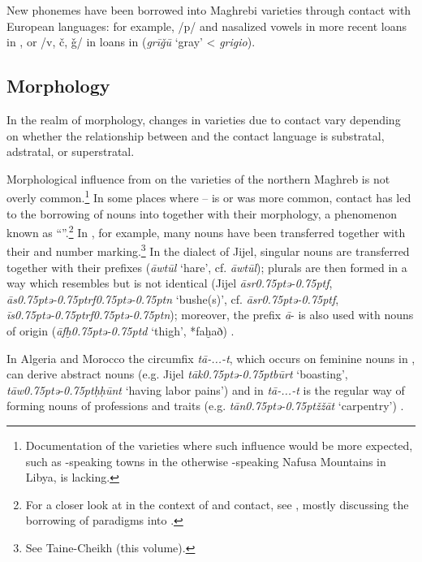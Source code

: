 \documentclass[output=paper]{langsci/langscibook}
\begin{document}
  New phonemes have been borrowed into Maghrebi varieties through contact with European languages: for example, /p/ and nasalized vowels in more recent  loans in  , or /v, č, ǧ/ in  loans in   (\textit{grīǧū} ‘gray’ < \textit{grigio}).

  \subsection{Morphology}\label{Morphology}

In the realm of morphology, changes in  varieties due to contact vary depending on whether the relationship between  and the contact language is substratal, adstratal, or superstratal.

  Morphological influence from  on the  varieties of the northern Maghreb is not overly common.\footnote{Documentation of the varieties where such influence would be more expected, such as -speaking towns in the otherwise -speaking Nafusa Mountains in Libya, is lacking.} In some places where --  is or was more common, contact has led to the borrowing of  nouns into  together with their morphology, a phenomenon known as “”.\footnote{For a closer look at  in the context of  and  contact, see \citet{Kossmann2010}, mostly discussing the borrowing of  paradigms into .} In , for example, many nouns have been transferred together with their  and number marking.\footnote{See Taine-Cheikh (this volume).} In the dialect of Jijel,  singular nouns are transferred together with their prefixes (\textit{āwtūl} ‘hare’, cf.  \textit{āwtūl}); plurals are then formed in a way which resembles  but is not identical (Jijel \textit{āsr\kern 0.75ptǝ\kern -0.75ptf}, \textit{ās\kern 0.75ptǝ\kern -0.75ptrf\kern 0.75ptǝ\kern -0.75ptn} ‘bushe(s)’, cf.   \textit{āsr\kern 0.75ptǝ\kern -0.75ptf}, \textit{īs\kern 0.75ptǝ\kern -0.75ptrf\kern 0.75ptǝ\kern -0.75ptn}); moreover, the prefix \textit{ā}{}- is also used with nouns of  origin (\textit{āfḫ\kern 0.75ptǝ\kern -0.75ptd} ‘thigh’,  *faḫað) \citep[302–318]{Marçais1956}.

  In Algeria and Morocco the circumfix \textit{tā-...-t}, which occurs on feminine nouns in , can derive abstract nouns (e.g. Jijel \textit{tāk\kern 0.75ptǝ\kern -0.75ptbūrt} ‘boasting’, \textit{tāw\kern 0.75ptǝ\kern -0.75ptḥḥūnt} ‘having labor pains’) and in   \textit{tā-...-t} is the regular way of forming nouns of professions and traits (e.g. \textit{tān\kern 0.75ptǝ\kern -0.75ptžžā{\R}t} ‘carpentry’) \citep{Kossmann2013chapter}.
\end{document}
